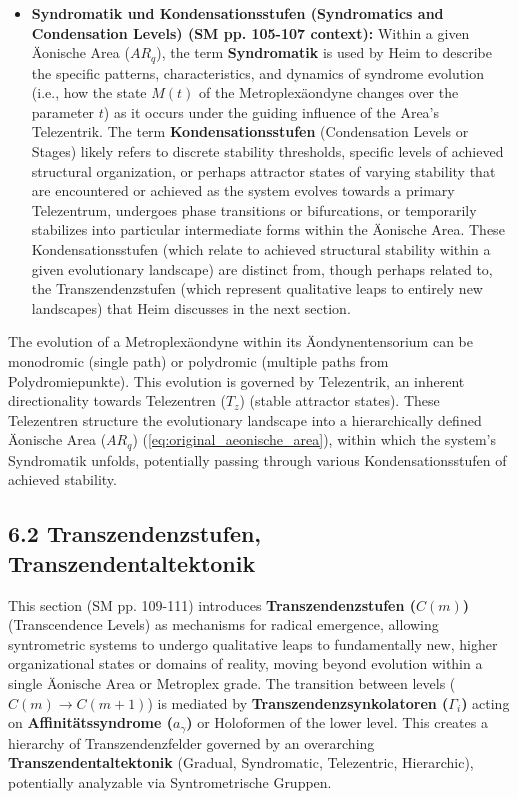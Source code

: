\documentclass[12pt]{article}
\newcommand{\conceptualsyndrome}{a} %
\newcommand{\telezentrum}{T_z}
\newcommand{\aeonischearea}{AR_q}
\newcommand{\transzendenzstufe}[1]{C(#1)}
\newcommand{\transzendenzsynkolator}{\Gamma_i}
\begin{document}
\begin{itemize}
    \item \textbf{Syndromatik und Kondensationsstufen (Syndromatics and Condensation Levels) (SM pp. 105-107 context):}
    Within a given Äonische Area (\(\aeonischearea\)), the term \textbf{Syndromatik} is used by Heim to describe the specific patterns, characteristics, and dynamics of syndrome evolution (i.e., how the state \( M(t) \) of the Metroplexäondyne changes over the parameter \(t\)) as it occurs under the guiding influence of the Area's Telezentrik. The term \textbf{Kondensationsstufen} (Condensation Levels or Stages) likely refers to discrete stability thresholds, specific levels of achieved structural organization, or perhaps attractor states of varying stability that are encountered or achieved as the system evolves towards a primary Telezentrum, undergoes phase transitions or bifurcations, or temporarily stabilizes into particular intermediate forms within the Äonische Area. These Kondensationsstufen (which relate to achieved structural stability within a given evolutionary landscape) are distinct from, though perhaps related to, the Transzendenzstufen (which represent qualitative leaps to entirely new landscapes) that Heim discusses in the next section.
\end{itemize}

The evolution of a Metroplexäondyne within its Äondynentensorium can be monodromic (single path) or polydromic (multiple paths from Polydromiepunkte). This evolution is governed by Telezentrik, an inherent directionality towards Telezentren (\(\telezentrum\)) (stable attractor states). These Telezentren structure the evolutionary landscape into a hierarchically defined Äonische Area (\(\aeonischearea\)) (\eqref{eq:original_aeonische_area}), within which the system's Syndromatik unfolds, potentially passing through various Kondensationsstufen of achieved stability.

\subsection{6.2 Transzendenzstufen, Transzendentaltektonik}
\label{sec:transzendenz}

This section (SM pp. 109-111) introduces \textbf{Transzendenzstufen (\(\transzendenzstufe{m}\))} (Transcendence Levels) as mechanisms for radical emergence, allowing syntrometric systems to undergo qualitative leaps to fundamentally new, higher organizational states or domains of reality, moving beyond evolution within a single Äonische Area or Metroplex grade. The transition between levels (\(\transzendenzstufe{m} \to \transzendenzstufe{m+1}\)) is mediated by \textbf{Transzendenzsynkolatoren (\(\transzendenzsynkolator\))} acting on \textbf{Affinitätssyndrome (\(\conceptualsyndrome_\gamma\))} or Holoformen of the lower level. This creates a hierarchy of Transzendenzfelder governed by an overarching \textbf{Transzendentaltektonik} (Gradual, Syndromatic, Telezentric, Hierarchic), potentially analyzable via Syntrometrische Gruppen.
\end{document}
